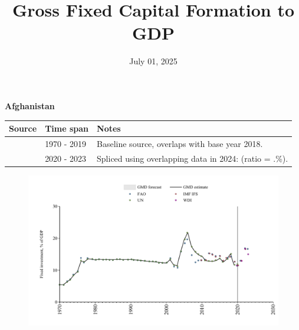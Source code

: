 \documentclass[12pt,a4paper,landscape]{article}
\begin{document}
\title{\Large Gross Fixed Capital Formation to GDP}
\date{July 01, 2025}
\maketitle
\thispagestyle{empty}

\clearpage
\setcounter{page}{1}
\hypersetup{colorlinks=true,linkcolor=blue,linktoc=all}
\label{toc}
\tableofcontents
\thispagestyle{empty}
\setcounter{page}{3}
\begin{adjustbox}{max totalsize={\paperwidth}{\paperheight},center}
\begin{minipage}[t][\textheight][t]{\textwidth}
\vspace*{0.5cm}
{}
\begin{center}
{\Large\bfseries Afghanistan}
\end{center}
\vspace{0.5cm}
\begin{table}[H]
\centering
\small
\begin{tabular}{|l|l|l|}
\hline
\textbf{Source} & \textbf{Time span} & \textbf{Notes} \\
\hline
\rowcolor{white}\cite{UN}& 1970 - 2019 &Baseline source, overlaps with base year 2018.\\
\rowcolor{lightgray}\cite{WDI}& 2020 - 2023 &Spliced using overlapping data in 2024: (ratio = .\%).\\
\hline
\end{tabular}
\end{table}
\begin{figure}[H]
\centering
\includegraphics[width=\textwidth,height=0.6\textheight,keepaspectratio]{graphs/AFG_finv_GDP.pdf}
\end{figure}
\end{minipage}
\end{adjustbox}
\end{document}
